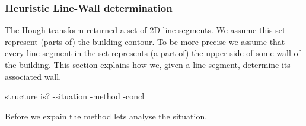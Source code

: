 \documentclass[10pt]{article}
\begin{document}
\subsubsection{Heuristic Line-Wall determination}
% 
% 

	
	The Hough transform returned a set of 2D line segments. We assume this set
	represent (parts of) the building contour. To be more precise we assume
	that every line segment in the set represents (a part of) the upper side of
	some wall of the building. This section explains how we, given a line
	segment, determine its associated wall.

	
	structure is?
	-situation
	-method
	-concl

	Before we expain the method lets analyse the situation.
\end{document}

